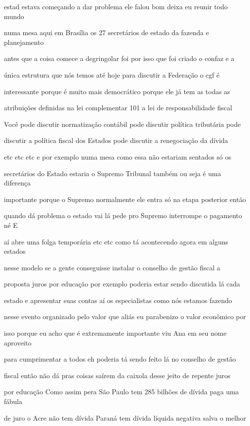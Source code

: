 \documentclass[a4paper,12pt]{article}
\begin{document}
estad estava começando a dar problema ele falou bom deixa eu reunir todo mundo

numa mesa aqui em Brasília os 27 secretários de estado da fazenda e planejamento

antes que a coisa comece a degringolar foi por isso que foi criado o confaz e a

única estrutura que nós temos até hoje para discutir a Federação o cgf é

interessante porque é muito mais democrático porque ele já tem as todas as

atribuições definidas na lei complementar 101 a lei de responsabilidade fiscal

Você pode discutir normatização contábil pode discutir política tributária pode

discutir a política fiscal dos Estados pode discutir a renegociação da dívida

etc etc etc e por exemplo numa mesa como essa não estariam sentados só os

secretários do Estado estaria o Supremo Tribunal também ou seja é uma diferença

importante porque o Supremo normalmente ele entra só na etapa posterior então

quando dá problema o estado vai lá pede pro Supremo interrompe o pagamento né E

aí abre uma folga temporária etc etc como tá acontecendo agora em alguns estados

nesse modelo se a gente conseguisse instalar o conselho de gestão fiscal a

proposta juros por educação por exemplo poderia estar sendo discutida lá cada

estado e apresentar suas contas aí os especialistas como nós estamos fazendo

nesse evento organizado pelo valor que aliás eu parabenizo o valor econômico por

isso porque eu acho que é extremamente importante viu Ana em seu nome aproveito

para cumprimentar a todos eh poderia tá sendo feito lá no conselho de gestão

fiscal então não dá pras coisas saírem da caixola desse jeito de repente juros

por educação Como assim pera São Paulo tem 285 bilhões de dívida paga uma fábula

de juro o Acre não tem dívida Paraná tem dívida líquida negativa salva o melhor
\end{document}
